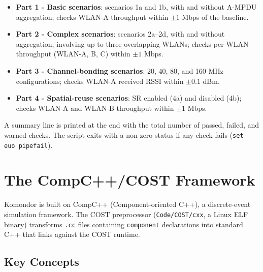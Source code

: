\documentclass[11pt,a4paper]{article}
\begin{document}
\begin{itemize}
    \item \textbf{Part 1 - Basic scenarios}: scenarios 1a and 1b, with and without A-MPDU aggregation; checks WLAN-A throughput within $\pm 1$ Mbps of the baseline.
    \item \textbf{Part 2 - Complex scenarios}: scenarios 2a--2d, with and without aggregation, involving up to three overlapping WLANs; checks per-WLAN throughput (WLAN-A, B, C) within $\pm 1$ Mbps.
    \item \textbf{Part 3 - Channel-bonding scenarios}: 20, 40, 80, and 160 MHz configurations; checks WLAN-A received RSSI within $\pm 0.1$ dBm.
    \item \textbf{Part 4 - Spatial-reuse scenarios}: SR enabled (4a) and disabled (4b); checks WLAN-A and WLAN-B throughput within $\pm 1$ Mbps.
\end{itemize}

A summary line is printed at the end with the total number of passed, failed, and warned checks. The script exits with a non-zero status if any check fails (\texttt{set -euo pipefail}).


\section{The CompC++/COST Framework}
\label{sec:cost}

Komondor is built on CompC++ (Component-oriented C++), a discrete-event simulation framework.  The COST preprocessor (\texttt{Code/COST/cxx}, a Linux ELF binary) transforms \texttt{.cc} files containing \texttt{component} declarations into standard C++ that links against the COST runtime.

\subsection{Key Concepts}
\end{document}
